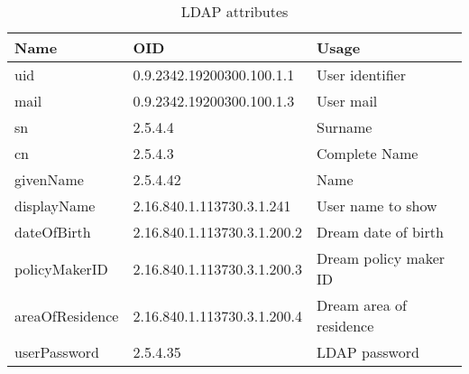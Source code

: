 \begin{table}[h!]
    \centering
    \caption{LDAP attributes}
    \label{tab:ldap_attrs}
    \begin{tabular}{l|l|l}
    \hline
     \textbf{Name}&\textbf{OID} & \textbf{Usage} \\\hline
        uid & 0.9.2342.19200300.100.1.1 & User identifier\\
        mail & 0.9.2342.19200300.100.1.3 & User mail\\
        sn & 2.5.4.4 & Surname \\
        cn & 2.5.4.3 & Complete Name\\
        givenName & 2.5.4.42 & Name\\
        displayName & 2.16.840.1.113730.3.1.241 & User name to show\\
        dateOfBirth & 2.16.840.1.113730.3.1.200.2 & Dream date of birth \\
        policyMakerID & 2.16.840.1.113730.3.1.200.3 & Dream policy maker ID\\
        areaOfResidence & 2.16.840.1.113730.3.1.200.4 & Dream area of residence\\
        userPassword & 2.5.4.35 & LDAP password\\\hline
    \end{tabular}
    
\end{table}

